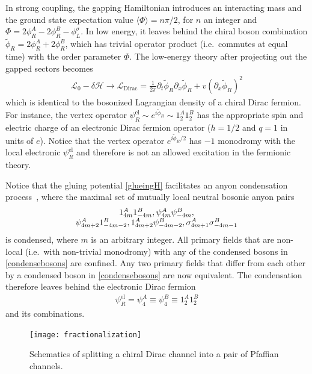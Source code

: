 In strong coupling, the gapping Hamiltonian introduces an interacting mass and the ground state expectation value $\langle\Phi\rangle=n\pi/2$, for $n$ an integer and $\Phi=2\phi^A_R-2\phi^B_R-\phi^\sigma_L$. In low energy, it leaves behind the chiral boson combination $\tilde\phi_R=2\phi_R^A+2\phi_R^B$, which has trivial operator product (i.e.~commutes at equal time) with the order parameter $\Phi$. The low-energy theory after projecting out the gapped sectors becomes \begin{align}\mathcal{L}_0-\delta\mathcal{H}\longrightarrow\mathcal{L}_{\mathrm{Dirac}}=\frac{1}{2\pi}\partial_t\tilde\phi_R\partial_x\tilde\phi_R+v(\partial_x\tilde\phi_R)^2\end{align} which is identical to the bosonized Lagrangian density of a chiral Dirac fermion. For instance, the vertex operator $\psi_R^{\mathrm{el}}\sim e^{i\tilde\phi_R}\sim 1_2^A1_2^B$ has the appropriate spin and electric charge of an electronic Dirac fermion operator ($h=1/2$ and $q=1$ in units of $e$). Notice that the vertex operator $e^{i\tilde\phi_R/2}$ has $-1$ monodromy with the local electronic $\psi_R^{\mathrm{el}}$ and therefore is not an allowed excitation in the fermionic theory.

Notice that the gluing potential \eqref{glueingH} facilitates an anyon condensation process~\cite{BaisSlingerlandCondensation}, where the maximal set of mutually local neutral bosonic anyon pairs \begin{align}\begin{array}{*{20}c}1_{4m}^A1_{-4m}^B,\psi_{4m}^A\psi_{-4m}^B,\\\psi_{4m+2}^A1_{-4m-2}^B,1_{4m+2}^A\psi_{-4m-2}^B,\sigma_{4m+1}^A\sigma_{-4m-1}^B\end{array}\label{condensebosons}\end{align} is condensed, where $m$ is an arbitrary integer. All primary fields that are non-local (i.e.~with non-trivial monodromy) with any of the condensed bosons in \eqref{condensebosons} are confined. Any two primary fields that differ from each other by a condensed boson in \eqref{condensebosons} are now equivalent. The condensation therefore leaves behind the electronic Dirac fermion \begin{align}\psi^{\mathrm{el}}_R=\psi^A_4\equiv\psi^B_4\equiv1_2^A1_2^B\end{align} and its combinations. 

\begin{figure}[htbp]
	\centering\texttt{[image: fractionalization]}
	\caption{Schematics of splitting a chiral Dirac channel into a pair of Pfaffian channels.}\label{fig:fractionalization}
\end{figure}

